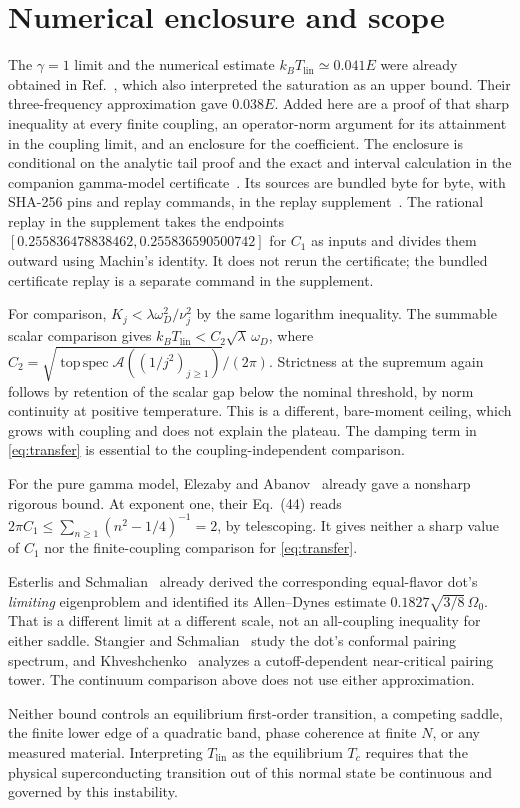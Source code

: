 \documentclass[11pt]{article}
\newcommand{\lin}{\mathrm{lin}}
\newcommand{\topsp}{\operatorname{top\,spec}}
\begin{document}
\section{Numerical enclosure and scope}
The $\gamma=1$ limit and the numerical estimate $k_BT_\lin\simeq 0.041E$ were already obtained in Ref.~\cite{GB}, which also interpreted the saturation as an upper bound. Their three-frequency approximation gave $0.038E$. Added here are a proof of that sharp inequality at every finite coupling, an operator-norm argument for its attainment in the coupling limit, and an enclosure for the coefficient. The enclosure is conditional on the analytic tail proof and the exact and interval calculation in the companion gamma-model certificate~\cite{GammaCert}. Its sources are bundled byte for byte, with SHA-256 pins and replay commands, in the replay supplement~\cite{Supp}. The rational replay in the supplement takes the endpoints $[0.255836478838462,0.255836590500742]$ for $C_1$ as inputs and divides them outward using Machin's identity. It does not rerun the certificate; the bundled certificate replay is a separate command in the supplement.

For comparison, $K_j<\lambda\omega_D^2/\nu_j^2$ by the same logarithm inequality. The summable scalar comparison gives $k_BT_\lin<C_2\sqrt\lambda\,\omega_D$, where $C_2=\sqrt{\topsp\mathcal A((1/j^2)_{j\ge1})}/(2\pi)$. Strictness at the supremum again follows by retention of the scalar gap below the nominal threshold, by norm continuity at positive temperature. This is a different, bare-moment ceiling, which grows with coupling and does not explain the plateau. The damping term in \eqref{eq:transfer} is essential to the coupling-independent comparison.

For the pure gamma model, Elezaby and Abanov~\cite{EA} already gave a nonsharp rigorous bound. At exponent one, their Eq.~(44) reads $2\pi C_1\le\sum_{n\ge1}(n^2-1/4)^{-1}=2$, by telescoping. It gives neither a sharp value of $C_1$ nor the finite-coupling comparison for \eqref{eq:transfer}.

Esterlis and Schmalian~\cite{ES} already derived the corresponding equal-flavor dot's \emph{limiting} eigenproblem and identified its Allen--Dynes estimate $0.1827\sqrt{3/8}\,\Omega_0$. That is a different limit at a different scale, not an all-coupling inequality for either saddle. Stangier and Schmalian~\cite{SS} study the dot's conformal pairing spectrum, and Khveshchenko~\cite{DK} analyzes a cutoff-dependent near-critical pairing tower. The continuum comparison above does not use either approximation.

Neither bound controls an equilibrium first-order transition, a competing saddle, the finite lower edge of a quadratic band, phase coherence at finite $N$, or any measured material. Interpreting $T_\lin$ as the equilibrium $T_c$ requires that the physical superconducting transition out of this normal state be continuous and governed by this instability.



\end{document}
